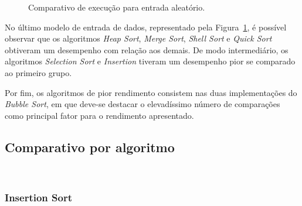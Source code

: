 \documentclass[conference]{IEEEtran}
\begin{document}
\begin{figure}

\centering
{}

\caption{Comparativo de execução para entrada aleatório.}
\label{image: aleatoria}
\end{figure}

No último modelo de entrada de dados, representado pela Figura~\ref{image: aleatoria}, é possível observar que os algoritmos \textit{Heap Sort}, \textit{Merge Sort}, \textit{Shell Sort} e \textit{Quick Sort} obtiveram um desempenho com relação aos demais. De modo intermediário, os algoritmos \textit{Selection Sort} e \textit{Insertion} tiveram um desempenho pior se comparado ao primeiro grupo. 

Por fim, os algoritmos de pior rendimento consistem nas duas implementações do \textit{Bubble Sort}, em que deve-se destacar o elevadíssimo número de comparações como principal fator para o rendimento apresentado.


\subsection{Comparativo por algoritmo}
~\\
\subsubsection{Insertion Sort}
\end{document}
